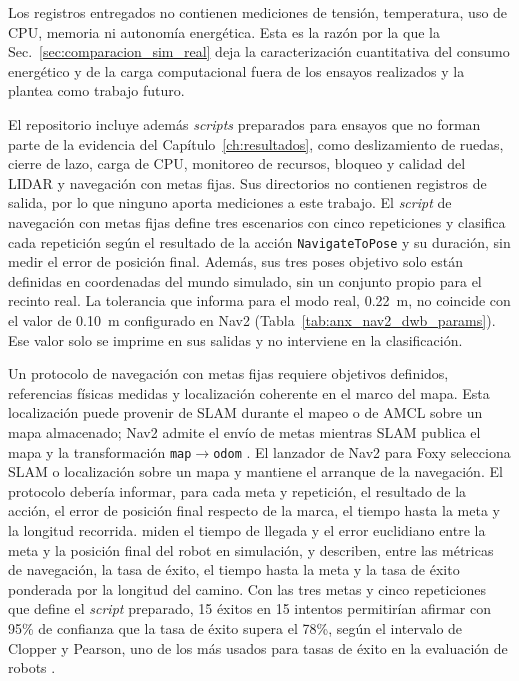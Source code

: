\begin{appendices}
Los registros entregados no contienen mediciones de tensión, temperatura, uso
de CPU, memoria ni autonomía energética. Esta es la razón por la que la
Sec.~\ref{sec:comparacion_sim_real} deja la caracterización cuantitativa del
consumo energético y de la carga computacional fuera de los ensayos realizados
y la plantea como trabajo futuro.

El repositorio incluye además \textit{scripts} preparados para ensayos que no forman
parte de la evidencia del Capítulo~\ref{ch:resultados}, como deslizamiento de
ruedas, cierre de lazo, carga de CPU, monitoreo de recursos, bloqueo y calidad
del \gls{LIDAR} y navegación con metas fijas. Sus directorios no contienen
registros de salida, por lo que ninguno aporta mediciones a este trabajo. El
\textit{script} de navegación con metas fijas define tres escenarios con cinco
repeticiones y clasifica cada repetición según el resultado de la acción
\texttt{NavigateToPose} y su duración, sin medir el error de posición final.
Además, sus tres poses objetivo solo están definidas en coordenadas del mundo
simulado, sin un conjunto propio para el recinto real.
La tolerancia que informa para el modo real, 0.22~m, no coincide con el valor
de 0.10~m configurado en Nav2 (Tabla~\ref{tab:anx_nav2_dwb_params}). Ese valor
solo se imprime en sus salidas y no interviene en la clasificación.

Un protocolo de navegación con metas fijas requiere objetivos definidos,
referencias físicas medidas y localización coherente en el marco del mapa.
Esta localización puede provenir de SLAM durante el mapeo o de AMCL sobre un
mapa almacenado; Nav2 admite el envío de metas mientras SLAM publica el mapa y
la transformación \texttt{map}$\to$\texttt{odom}
\citep{nav2_foxy_bringup}. El lanzador de Nav2 para Foxy selecciona SLAM o
localización sobre un mapa y mantiene el arranque de la navegación. El
protocolo debería informar, para cada meta y repetición, el resultado de la acción, el error de
posición final respecto de la marca, el tiempo hasta la meta y la longitud
recorrida. \citet{ngoc2023efficient} miden el tiempo de llegada y el error
euclidiano entre la meta y la posición final del robot en simulación, y
\citet{francis2025principles} describen, entre las métricas de navegación, la
tasa de éxito, el tiempo hasta la meta y la tasa de éxito ponderada por la
longitud del camino. Con las tres metas y cinco repeticiones que define el
\textit{script} preparado, 15 éxitos en 15 intentos permitirían afirmar con 95\%
de confianza que la tasa de éxito supera el 78\%, según el intervalo de Clopper
y Pearson, uno de los más usados para tasas de éxito en la evaluación de robots
\citep{vincent2024generalizable}.


\end{appendices}
